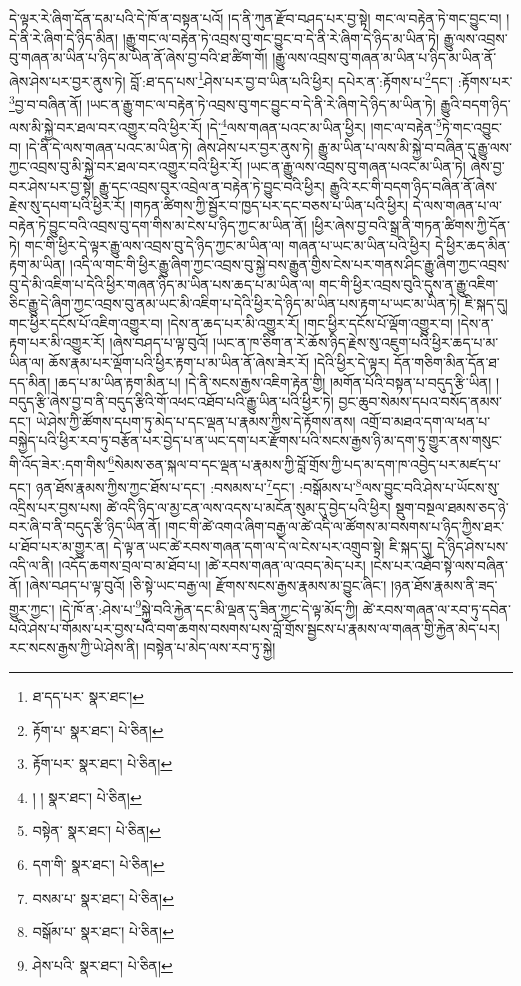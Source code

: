 དེ་ལྟར་རེ་ཞིག་དོན་དམ་པའི་དེ་ཁོ་ན་བསྟན་པའོ། །ད་ནི་ཀུན་རྫོབ་བཤད་པར་བྱ་སྟེ། གང་ལ་བརྟེན་ཏེ་གང་བྱུང་བ། །དེ་ནི་རེ་ཞིག་དེ་ཉིད་མིན། །རྒྱུ་གང་ལ་བརྟེན་ཏེ་འབྲས་བུ་གང་བྱུང་བ་དེ་ནི་རེ་ཞིག་དེ་ཉིད་མ་ཡིན་ཏེ། རྒྱུ་ལས་འབྲས་བུ་གཞན་མ་ཡིན་པ་ཉིད་མ་ཡིན་ནོ་ཞེས་བྱ་བའི་ཐ་ཚིག་གོ། །རྒྱུ་ལས་འབྲས་བུ་གཞན་མ་ཡིན་པ་ཉིད་མ་ཡིན་ནོ་ཞེས་ཤེས་པར་བྱར་ནུས་ཏེ། བློ་:ཐ་དད་པས་\footnote{ཐ་དད་པར་  སྣར་ཐང་། }ཤེས་པར་བྱ་བ་ཡིན་པའི་ཕྱིར། དཔེར་ན་:རྟོགས་པ་\footnote{རྟོག་པ་  སྣར་ཐང་།  པེ་ཅིན། }དང་། :རྟོགས་པར་\footnote{རྟོག་པར་  སྣར་ཐང་།  པེ་ཅིན། }བྱ་བ་བཞིན་ནོ། །ཡང་ན་རྒྱུ་གང་ལ་བརྟེན་ཏེ་འབྲས་བུ་གང་བྱུང་བ་དེ་ནི་རེ་ཞིག་དེ་ཉིད་མ་ཡིན་ཏེ། རྒྱུའི་བདག་ཉིད་ལས་མི་སྐྱེ་བར་ཐལ་བར་འགྱུར་བའི་ཕྱིར་རོ། །དེ་\footnote{། །  སྣར་ཐང་།  པེ་ཅིན། }ལས་གཞན་པའང་མ་ཡིན་ཕྱིར། །གང་ལ་བརྟེན་\footnote{བསྟེན་  སྣར་ཐང་།  པེ་ཅིན། }ཏེ་གང་འབྱུང་བ། །དེ་ནི་དེ་ལས་གཞན་པའང་མ་ཡིན་ཏེ། ཞེས་ཤེས་པར་བྱར་ནུས་ཏེ། རྒྱུ་མ་ཡིན་པ་ལས་མི་སྐྱེ་བ་བཞིན་དུ་རྒྱུ་ལས་ཀྱང་འབྲས་བུ་མི་སྐྱེ་བར་ཐལ་བར་འགྱུར་བའི་ཕྱིར་རོ། །ཡང་ན་རྒྱུ་ལས་འབྲས་བུ་གཞན་པའང་མ་ཡིན་ཏེ། ཞེས་བྱ་བར་ཤེས་པར་བྱ་སྟེ། རྒྱུ་དང་འབྲས་བུར་འབྲེལ་ན་བརྟེན་ཏེ་བྱུང་བའི་ཕྱིར། རྒྱུའི་རང་གི་བདག་ཉིད་བཞིན་ནོ་ཞེས་རྗེས་སུ་དཔག་པའི་ཕྱིར་རོ། །གཏན་ཚིགས་ཀྱི་སྦྱོར་བ་ཁྱད་པར་དང་བཅས་པ་ཡིན་པའི་ཕྱིར། དེ་ལས་གཞན་པ་ལ་བརྟེན་ཏེ་བྱུང་བའི་འབྲས་བུ་དག་གིས་མ་ངེས་པ་ཉིད་ཀྱང་མ་ཡིན་ནོ། །ཕྱིར་ཞེས་བྱ་བའི་སྒྲ་ནི་གཏན་ཚིགས་ཀྱི་དོན་ཏེ། གང་གི་ཕྱིར་དེ་ལྟར་རྒྱུ་ལས་འབྲས་བུ་དེ་ཉིད་ཀྱང་མ་ཡིན་ལ། གཞན་པ་ཡང་མ་ཡིན་པའི་ཕྱིར། དེ་ཕྱིར་ཆད་མིན་རྟག་མ་ཡིན། །འདི་ལ་གང་གི་ཕྱིར་རྒྱུ་ཞིག་ཀྱང་འབྲས་བུ་སྐྱེ་བས་རྒྱུན་གྱིས་ངེས་པར་གནས་ཤིང་རྒྱུ་ཞིག་ཀྱང་འབྲས་བུ་དེ་མི་འཇིག་པ་དེའི་ཕྱིར་གཞན་ཉིད་མ་ཡིན་པས་ཆད་པ་མ་ཡིན་ལ། གང་གི་ཕྱིར་འབྲས་བུའི་དུས་ན་རྒྱུ་འཇིག་ཅིང་རྒྱུ་དེ་ཞིག་ཀྱང་འབྲས་བུ་ནམ་ཡང་མི་འཇིག་པ་དེའི་ཕྱིར་དེ་ཉིད་མ་ཡིན་པས་རྟག་པ་ཡང་མ་ཡིན་ཏེ། ཇི་སྐད་དུ། གང་ཕྱིར་དངོས་པོ་འཇིག་འགྱུར་བ། །དེས་ན་ཆད་པར་མི་འགྱུར་རོ། །གང་ཕྱིར་དངོས་པོ་ལྡོག་འགྱུར་བ། །དེས་ན་རྟག་པར་མི་འགྱུར་རོ། །ཞེས་བཤད་པ་ལྟ་བུའོ། །ཡང་ན་ཁ་ཅིག་ན་རེ་ཆོས་ཉིད་རྗེས་སུ་འཇུག་པའི་ཕྱིར་ཆད་པ་མ་ཡིན་ལ། ཆོས་རྣམ་པར་ལྡོག་པའི་ཕྱིར་རྟག་པ་མ་ཡིན་ནོ་ཞེས་ཟེར་རོ། །དེའི་ཕྱིར་དེ་ལྟར། དོན་གཅིག་མིན་དོན་ཐ་དད་མིན། །ཆད་པ་མ་ཡིན་རྟག་མིན་པ། །དེ་ནི་སངས་རྒྱས་འཇིག་རྟེན་གྱི། །མགོན་པོའི་བསྟན་པ་བདུད་རྩི་ཡིན། །བདུད་རྩི་ཞེས་བྱ་བ་ནི་བདུད་རྩིའི་གོ་འཕང་འཐོབ་པའི་རྒྱུ་ཡིན་པའི་ཕྱིར་ཏེ། བྱང་ཆུབ་སེམས་དཔའ་བསོད་ནམས་དང་། ཡེ་ཤེས་ཀྱི་ཚོགས་དཔག་ཏུ་མེད་པ་དང་ལྡན་པ་རྣམས་ཀྱིས་དེ་རྟོགས་ནས། འགྲོ་བ་མཐའ་དག་ལ་ཕན་པ་བསྐྱེད་པའི་ཕྱིར་རབ་ཏུ་བརྩོན་པར་བྱེད་པ་ན་ཡང་དག་པར་རྫོགས་པའི་སངས་རྒྱས་ཉི་མ་དག་ཏུ་གྱུར་ནས་གསུང་གི་འོད་ཟེར་:དག་གིས་\footnote{དག་གི་  སྣར་ཐང་།  པེ་ཅིན། }སེམས་ཅན་སྐལ་བ་དང་ལྡན་པ་རྣམས་ཀྱི་བློ་གྲོས་ཀྱི་པད་མ་དག་ཁ་འབྱེད་པར་མཛད་པ་དང་། ཉན་ཐོས་རྣམས་ཀྱིས་ཀྱང་ཐོས་པ་དང་། :བསམས་པ་\footnote{བསམ་པ་  སྣར་ཐང་།  པེ་ཅིན། }དང་། :བསྒོམས་པ་\footnote{བསྒོམ་པ་  སྣར་ཐང་།  པེ་ཅིན། }ལས་བྱུང་བའི་ཤེས་པ་ཡོངས་སུ་འདྲིས་པར་བྱས་པས། ཚེ་འདི་ཉིད་ལ་མྱ་ངན་ལས་འདས་པ་མངོན་སུམ་དུ་བྱེད་པའི་ཕྱིར། སྡུག་བསྔལ་ཐམས་ཅད་ཉེ་བར་ཞི་བ་ནི་བདུད་རྩི་ཉིད་ཡིན་ནོ། །གང་གི་ཚེ་འགའ་ཞིག་བརྒྱ་ལ་ཚེ་འདི་ལ་ཚོགས་མ་བསགས་པ་ཉིད་ཀྱིས་ཐར་པ་ཐོབ་པར་མ་གྱུར་ན། དེ་ལྟ་ན་ཡང་ཚེ་རབས་གཞན་དག་ལ་དེ་ལ་ངེས་པར་འགྲུབ་སྟེ། ཇི་སྐད་དུ། དེ་ཉིད་ཤེས་པས་འདི་ལ་ནི། །འདོད་ཆགས་བྲལ་བ་མ་ཐོབ་པ། །ཚེ་རབས་གཞན་ལ་འབད་མེད་པར། །ངེས་པར་འཐོབ་སྟེ་ལས་བཞིན་ནོ། །ཞེས་བཤད་པ་ལྟ་བུའོ། །ཅི་སྟེ་ཡང་བརྒྱ་ལ། རྫོགས་སངས་རྒྱས་རྣམས་མ་བྱུང་ཞིང་། །ཉན་ཐོས་རྣམས་ནི་ཟད་གྱུར་ཀྱང་། །དེ་ཁོ་ན་:ཤེས་པ་\footnote{ཤེས་པའི་  སྣར་ཐང་།  པེ་ཅིན། }སྐྱེ་བའི་རྐྱེན་དང་མི་ལྡན་དུ་ཟིན་ཀྱང་དེ་ལྟ་མོད་ཀྱི། ཚེ་རབས་གཞན་ལ་རབ་ཏུ་དབེན་པའི་ཤེས་པ་གོམས་པར་བྱས་པའི་བག་ཆགས་བསགས་པས་བློ་གྲོས་སྦྱངས་པ་རྣམས་ལ་གཞན་གྱི་རྐྱེན་མེད་པར། རང་སངས་རྒྱས་ཀྱི་ཡེ་ཤེས་ནི། །བསྟེན་པ་མེད་ལས་རབ་ཏུ་སྐྱེ། 